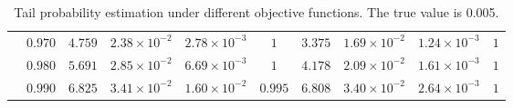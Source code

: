 \begin{table}[ht]
{\begin{tabular}{cc|cccc|cccc}
&$0.970$ & $4.759$ & $2.38\times 10^{-2}$ & $2.78\times 10^{-3}$ & $ 1$ & $3.375$ & $1.69\times 10^{-2}$ & $1.24\times 10^{-3}$ & $ 1$\\
&$0.980$ & $5.691$ & $2.85\times 10^{-2}$ & $6.69\times 10^{-3}$ & $ 1$ & $4.178$ & $2.09\times 10^{-2}$ & $1.61\times 10^{-3}$ & $ 1$\\
&$0.990$ & $6.825$ & $3.41\times 10^{-2}$ & $1.60\times 10^{-2}$ & $0.995$ & $6.808$ & $3.40\times 10^{-2}$ & $2.64\times 10^{-3}$ & $ 1$\\
    \hline
    \bottomrule
    \end{tabular}}\caption{Tail probability estimation under different objective functions. The true value is 0.005.}
    \label{tb4_tpe_0.7}
\end{table}